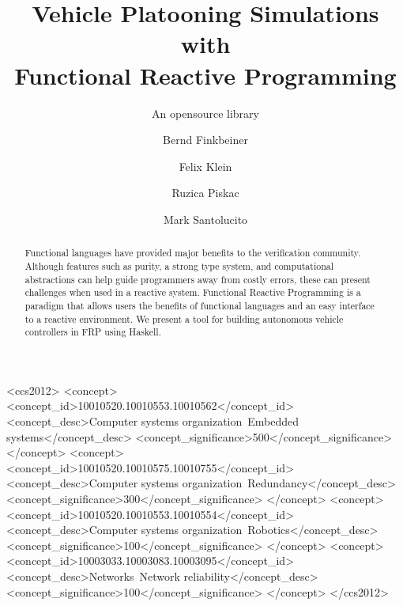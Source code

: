 \documentclass[sigconf]{acmart}
\begin{document}
\title{Vehicle Platooning Simulations with \\ Functional Reactive Programming}
\subtitle{An opensource library}

\author{Bernd Finkbeiner}

\author{Felix Klein}

\author{Ruzica Piskac}

\author{Mark Santolucito}

\begin{abstract}
Functional languages have provided major benefits to the verification community.
Although features such as purity, a strong type system, and computational abstractions can help guide programmers away from costly errors, these can present challenges when used in a reactive system.
Functional Reactive Programming is a paradigm that allows users the benefits of functional languages and an easy interface to a reactive environment.
We present a tool for building autonomous vehicle controllers in FRP using Haskell.
\end{abstract}

\iffalse
%
%
\begin{CCSXML}
<ccs2012>
 <concept>
  <concept_id>10010520.10010553.10010562</concept_id>
  <concept_desc>Computer systems organization~Embedded systems</concept_desc>
  <concept_significance>500</concept_significance>
 </concept>
 <concept>
  <concept_id>10010520.10010575.10010755</concept_id>
  <concept_desc>Computer systems organization~Redundancy</concept_desc>
  <concept_significance>300</concept_significance>
 </concept>
 <concept>
  <concept_id>10010520.10010553.10010554</concept_id>
  <concept_desc>Computer systems organization~Robotics</concept_desc>
  <concept_significance>100</concept_significance>
 </concept>
 <concept>
  <concept_id>10003033.10003083.10003095</concept_id>
  <concept_desc>Networks~Network reliability</concept_desc>
  <concept_significance>100</concept_significance>
 </concept>
</ccs2012>  
\end{CCSXML}
\end{document}
